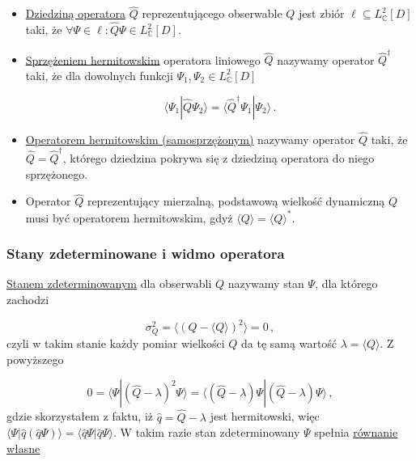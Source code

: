 \documentclass{myclass}
\begin{document}
\begin{itemize}
\item \underline{Dziedziną operatora} \(\hat{Q}\) reprezentującego obserwable \(Q\) jest zbiór
\(\ell\subseteq L^2_\mathbb{C}[D]\) taki, że \(\forall \Psi\in\ell: \hat{Q}\Psi\in
L^2_\mathbb{C}[D]\).

\item \underline{Sprzężeniem hermitowskim} operatora liniowego \(\hat{Q}\) nazywamy operator
\(\hat{Q}^\dag\) taki, że dla dowolnych funkcji \(\Psi_1, \Psi_2\in L^2_\mathbb{C}[D]\)

\begin{equation*}
\langle\Psi_1|\hat{Q}\Psi_2\rangle = \langle\hat{Q}^\dag\Psi_1|\Psi_2\rangle\,.
\end{equation*}

\item \underline{Operatorem hermitowskim (samosprzężonym)} nazywamy operator \(\hat{Q}\) taki, że
\(\hat{Q}=\hat{Q}^\dag\), którego dziedzina pokrywa się z dziedziną operatora do niego sprzężonego.

\item Operator \(\hat{Q}\) reprezentujący mierzalną, podstawową wielkość dynamiczną \(Q\) musi być
operatorem hermitowskim, gdyż \(\langle Q\rangle=\langle Q\rangle^*\).

\end{itemize}

\subsubsection{Stany zdeterminowane i widmo operatora}

\underline{Stanem zdeterminowanym} dla obserwabli \(Q\) nazywamy stan \(\Psi\), dla którego zachodzi

\begin{equation*}
\sigma_Q^2=\langle (Q-\langle Q\rangle)^2\rangle=0\,,
\end{equation*}
czyli w takim stanie każdy pomiar wielkości \(Q\) da tę samą wartość \(\lambda=\langle Q\rangle\). Z
powyższego

\begin{equation*}
0=\langle \Psi | (\hat{Q}-\lambda)^2\Psi \rangle = \langle (\hat{Q}-\lambda)\Psi | (\hat{Q}-\lambda) \Psi \rangle\,,
\end{equation*}
gdzie skorzystałem z faktu, iż \(\hat{q}=\hat{Q}-\lambda\) jest hermitowski, więc \(\langle \Psi
|\hat{q}(\hat{q}\Psi)\rangle = \langle \hat{q}\Psi | \hat{q}\Psi\rangle\). W takim razie stan
zdeterminowany \(\Psi\) spełnia
\underline{równanie własne}
\end{document}
